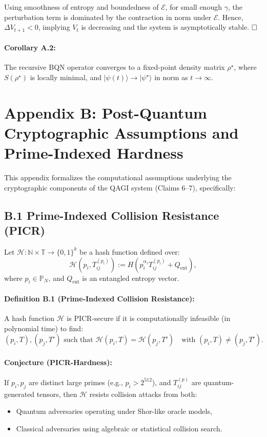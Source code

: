 Using smoothness of entropy and boundedness of \(\mathcal{E}\), for small enough \(\gamma\), the perturbation term is dominated by the contraction in norm under \(\mathcal{E}\). Hence, \(\Delta V_{t+1} < 0\), implying \(V_t\) is decreasing and the system is asymptotically stable. \(\hfill \square\)

\paragraph{Corollary A.2:}
The recursive BQN operator converges to a fixed-point density matrix \(\rho^\star\), where \(S(\rho^\star)\) is locally minimal, and \(|\psi(t)\rangle \to |\psi^\star\rangle\) in norm as \(t \to \infty\).

\section*{Appendix B: Post-Quantum Cryptographic Assumptions and Prime-Indexed Hardness}

This appendix formalizes the computational assumptions underlying the cryptographic components of the QAGI system (Claims 6–7), specifically:

\subsection*{B.1 Prime-Indexed Collision Resistance (PICR)}

Let \(\mathcal{H} : \mathbb{N} \times \mathbb{T} \to \{0,1\}^k\) be a hash function defined over:
\[
\mathcal{H}(p_i, T_{ij}^{(p_i)}) := H(p_i^{\alpha_i} T_{ij}^{(p_i)} + Q_{\text{ent}}),
\]
where \(p_i \in \mathbb{P}_N\), and \(Q_{\text{ent}}\) is an entangled entropy vector.

\paragraph{Definition B.1 (Prime-Indexed Collision Resistance):}
A hash function \(\mathcal{H}\) is PICR-secure if it is computationally infeasible (in polynomial time) to find:
\[
(p_i, T), (p_j, T') \text{ such that } \mathcal{H}(p_i, T) = \mathcal{H}(p_j, T') \quad \text{with } (p_i, T) \ne (p_j, T').
\]

\paragraph{Conjecture (PICR-Hardness):}
If \(p_i, p_j\) are distinct large primes (e.g., \(p_i > 2^{512}\)), and \(T_{ij}^{(p)}\) are quantum-generated tensors, then \(\mathcal{H}\) resists collision attacks from both:
\begin{itemize}
    \item Quantum adversaries operating under Shor-like oracle models,
    \item Classical adversaries using algebraic or statistical collision search.
\end{itemize}

